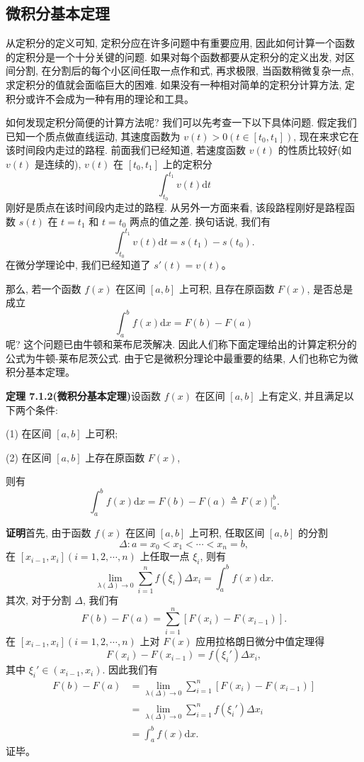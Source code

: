 \documentclass[UTF8,12pt,a4paper,fontset=fandol]{ctexart}
\begin{document}
\subsection{微积分基本定理}

从定积分的定义可知, 定积分应在许多问题中有重要应用, 因此如何计算一个函数的定积分是一个十分关键的问题. 如果对每个函数都要从定积分的定义出发, 对区间分割, 在分割后的每个小区间任取一点作和式, 再求极限, 当函数稍微复杂一点, 求定积分的值就会面临巨大的困难. 如果没有一种相对简单的定积分计算方法, 定积分或许不会成为一种有用的理论和工具。

如何发现定积分简便的计算方法呢? 我们可以先考查一下以下具体问题. 假定我们已知一个质点做直线运动, 其速度函数为 $v(t)>0(t\in[t_0,t_1])$, 现在来求它在该时间段内走过的路程. 前面我们已经知道, 若速度函数 $v(t)$ 的性质比较好(如 $v(t)$ 是连续的), $v(t)$ 在 $[t_0,t_1]$ 上的定积分
\[
  \int_{t_0}^{t_1}v(t)\mathrm dt
\]
刚好是质点在该时间段内走过的路程. 从另外一方面来看, 该段路程刚好是路程函数 $s(t)$ 在 $t=t_1$ 和 $t=t_0$ 两点的值之差. 换句话说, 我们有
\[
  \int_{t_0}^{t_1}v(t)\mathrm dt=s(t_1)-s(t_0).
\]
在微分学理论中, 我们已经知道了 $s'(t)=v(t)$。

那么, 若一个函数 $f(x)$ 在区间 $[a,b]$ 上可积, 且存在原函数 $F(x)$, 是否总是成立
\[
  \int_a^b f(x)\mathrm dx=F(b)-F(a)
\]
呢? 这个问题已由牛顿和莱布尼茨解决. 因此人们称下面定理给出的计算定积分的公式为牛顿-莱布尼茨公式. 由于它是微积分理论中最重要的结果, 人们也称它为微积分基本定理。

\noindent\textbf{定理 7.1.2(微积分基本定理)}\quad 设函数 $f(x)$ 在区间 $[a,b]$ 上有定义, 并且满足以下两个条件:

(1) 在区间 $[a,b]$ 上可积;

(2) 在区间 $[a,b]$ 上存在原函数 $F(x)$,

则有
\begin{equation}
  \int_a^b f(x)\mathrm dx=F(b)-F(a)\triangleq F(x)\big|_a^b.
  \tag{7.1.5}
\end{equation}

\noindent\textbf{证明}\quad 首先, 由于函数 $f(x)$ 在区间 $[a,b]$ 上可积, 任取区间 $[a,b]$ 的分割
\[
  \Delta:a=x_0<x_1<\cdots<x_n=b,
\]
在 $[x_{i-1},x_i](i=1,2,\cdots,n)$ 上任取一点 $\xi_i$, 则有
\[
  \lim_{\lambda(\Delta)\to0}\sum_{i=1}^n f(\xi_i)\Delta x_i=\int_a^b f(x)\mathrm dx.
\]
其次, 对于分割 $\Delta$, 我们有
\[
  F(b)-F(a)=\sum_{i=1}^n[F(x_i)-F(x_{i-1})].
\]
在 $[x_{i-1},x_i](i=1,2,\cdots,n)$ 上对 $F(x)$ 应用拉格朗日微分中值定理得
\[
  F(x_i)-F(x_{i-1})=f(\xi_i')\Delta x_i,
\]
其中 $\xi_i'\in(x_{i-1},x_i)$. 因此我们有
\[
\begin{aligned}
  F(b)-F(a)
  &=\lim_{\lambda(\Delta)\to0}\sum_{i=1}^n[F(x_i)-F(x_{i-1})]\\
  &=\lim_{\lambda(\Delta)\to0}\sum_{i=1}^n f(\xi_i')\Delta x_i\\
  &=\int_a^b f(x)\mathrm dx.
\end{aligned}
\]
证毕。
\end{document}
